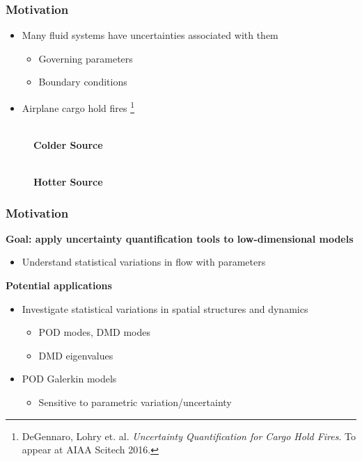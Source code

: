 \documentclass[9pt]{beamer}
\begin{document}
\begin{frame}
\frametitle{Motivation}
\label{sec-1-2}

\begin{itemize}
\item Many fluid systems have uncertainties associated with them
\begin{itemize}
\item Governing parameters
\item Boundary conditions
\end{itemize}
\item Airplane cargo hold fires \footnote{DeGennaro, Lohry et. al. \emph{Uncertainty Quantification for Cargo Hold Fires}. To appear at AIAA Scitech 2016.
 }
\end{itemize}
\begin{figure}[ht]
\centering
\begin{minipage}[b]{0.45\linewidth}
 \\
\centering
\textbf{Colder Source} \\
\end{minipage}
\begin{minipage}[b]{0.45\linewidth}
 \\
\centering
\textbf{Hotter Source}
\end{minipage}
\end{figure}
\end{frame}
\begin{frame}
\frametitle{Motivation}
\label{sec-1-3}

\textbf{Goal: apply uncertainty quantification tools to low-dimensional models}
\begin{itemize}
\item Understand statistical variations in flow with parameters
\end{itemize}
\textbf{Potential applications}
\begin{itemize}
\item Investigate statistical variations in spatial structures and dynamics
\begin{itemize}
\item POD modes, DMD modes
\item DMD eigenvalues
\end{itemize}
\item POD Galerkin models
\begin{itemize}
\item Sensitive to parametric variation/uncertainty
\end{itemize}
\end{itemize}
\end{frame}
\end{document}
